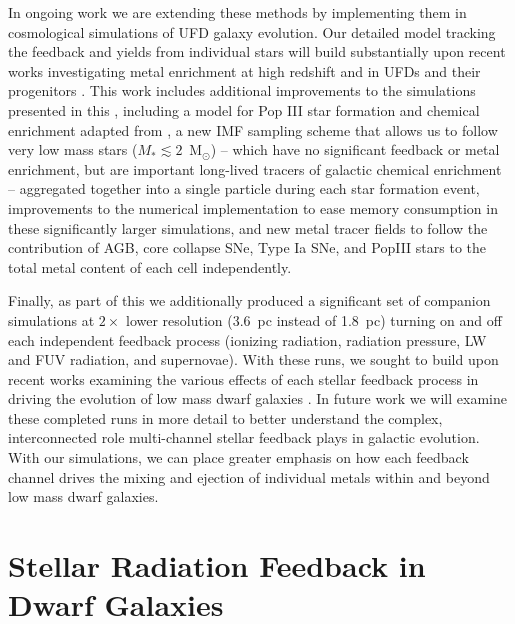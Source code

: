 In ongoing work we are extending these methods by implementing them in cosmological simulations of UFD galaxy evolution. Our detailed model tracking the feedback and yields from individual stars will build substantially upon recent works investigating metal enrichment at high redshift and in UFDs and their progenitors \citep[e.g.][]{Ritter2015,Jeon2017,Corlies2018,Wheeler2018,Agertz2019}. This work includes additional improvements to the simulations presented in this \Dissertation, including a model for Pop III star formation and chemical enrichment adapted from \cite{Wise2012a}, a new IMF sampling scheme that allows us to follow very low mass stars ($M_* \lesssim 2$~M$_{\odot}$) -- which have no significant feedback or metal enrichment, but are important long-lived tracers of galactic chemical enrichment -- aggregated together into a single particle during each star formation event, improvements to the numerical implementation to ease memory consumption in these significantly larger simulations, and new metal tracer fields to follow the contribution of AGB, core collapse SNe, Type Ia SNe, and PopIII stars to the total metal content of each cell independently.

Finally, as part of this \dissertation we additionally produced a significant set of companion simulations at $2 \times$ lower resolution (3.6~pc instead of 1.8~pc) turning on and off each independent feedback process (ionizing radiation, radiation pressure, LW and FUV radiation, and supernovae). With these runs, we sought to build upon recent works examining the various effects of each stellar feedback process in driving the evolution of low mass dwarf galaxies \citep{Hu2016,Hu2017,Hu2018,Forbes2016}. In future work we will examine these completed runs in more detail to better understand the complex, interconnected role multi-channel stellar feedback plays in galactic evolution. With our simulations, we can place greater emphasis on how each feedback channel drives the mixing and ejection of individual metals within and beyond low mass dwarf galaxies.

\section{Stellar Radiation Feedback in Dwarf Galaxies}
\label{conclusion:sec:ch2}

